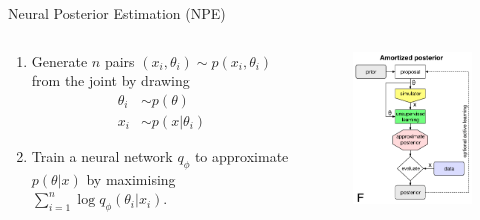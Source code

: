 \documentclass[12pt, aspectratio=169]{beamer}
\let\olditem\item
\renewcommand\item{\olditem\justifying}
\begin{document}
\begin{frame}{Neural Posterior Estimation (NPE)}
    \begin{columns}
        \begin{column}{0.5\textwidth}
            \begin{enumerate}[<+->]
                \item Generate $n$ pairs $(x_i, \theta_i) \sim p(x_i, \theta_i)$ from the joint by drawing 
                \begin{align}
                    \theta_i &\sim p(\theta) \nonumber \\
                    x_i &\sim p(x|\theta_i) \nonumber
                \end{align}
                \item Train a neural network $q_\phi$ to approximate $p(\theta|x)$ by maximising $\sum_{i=1}^n \log q_\phi(\theta_i | x_i)$.
            \end{enumerate}
            \parencite{papamakarios_fast_2018}
        \end{column}

        \begin{column}{0.5\textwidth}
            \begin{figure}
                \centering
                \includegraphics[height=0.6\textheight]{"images/SNPE.png"}
                \caption{\cite{cranmer_frontier_2020}}
            \end{figure}
        \end{column}
    \end{columns}
    


\end{frame}
\end{document}
